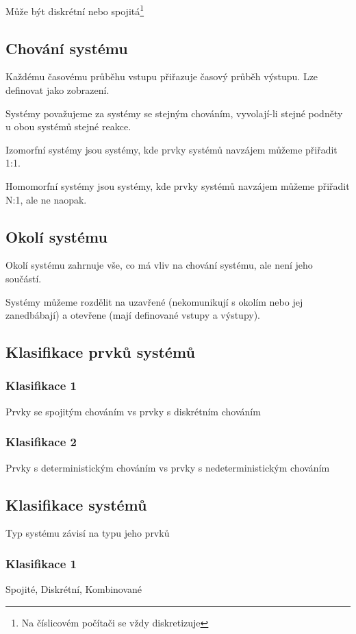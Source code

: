 \documentclass[11pt]{article}
\begin{document}
Může být diskrétní nebo spojitá\footnote{Na číslicovém počítači se vždy diskretizuje}

\subsection{Chování systému}
\label{sec:orgc320c3b}
Každému časovému průběhu vstupu přiřazuje časový průběh výstupu. Lze definovat
jako zobrazení.

Systémy považujeme za systémy se stejným chováním, vyvolají-li stejné podněty u
obou systémů stejné reakce.

Izomorfní systémy jsou systémy, kde prvky systémů navzájem můžeme přiřadit 1:1.

Homomorfní systémy jsou systémy, kde prvky systémů navzájem můžeme přiřadit N:1,
ale ne naopak.

\subsection{Okolí systému}
\label{sec:org94b95fa}
Okolí systému zahrnuje vše, co má vliv na chování systému, ale není jeho
součástí.

Systémy můžeme rozdělit na uzavřené (nekomunikují s okolím nebo jej zanedbábají)
a otevřene (mají definované vstupy a výstupy).

\subsection{Klasifikace prvků systémů}
\label{sec:org6bd1aea}
\subsubsection{Klasifikace 1}
\label{sec:orgc9dc767}
Prvky se spojitým chováním vs prvky s diskrétním chováním
\subsubsection{Klasifikace 2}
\label{sec:orgbc00676}
Prvky s deterministickým chováním vs prvky s nedeterministickým chováním

\subsection{Klasifikace systémů}
\label{sec:orgd4ae8a6}
Typ systému závisí na typu jeho prvků
\subsubsection{Klasifikace 1}
\label{sec:org32b469d}
Spojité, Diskrétní, Kombinované
\end{document}
